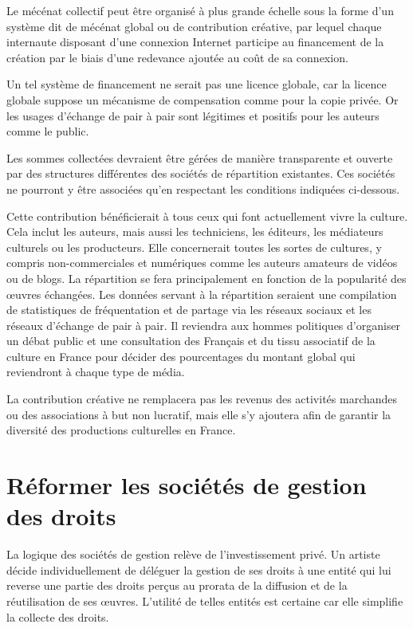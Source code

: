 \begin{mesure}
Le mécénat collectif peut être organisé à plus grande échelle sous la forme d'un système dit de mécénat global ou de contribution créative, par lequel chaque internaute disposant d'une connexion Internet participe au financement de la création par le biais d'une redevance ajoutée au coût de sa connexion. 
\end{mesure}

Un tel système de financement ne serait pas une licence globale, car la licence globale suppose un mécanisme de compensation comme pour la copie privée. Or les usages d'échange de pair à pair sont légitimes et positifs pour les auteurs comme le public.

Les sommes collectées devraient être gérées de manière transparente et ouverte par des structures différentes des sociétés de répartition existantes. Ces sociétés ne pourront y être associées qu'en respectant les conditions indiquées ci-dessous. 

Cette contribution bénéficierait à tous ceux qui font actuellement vivre la culture. Cela inclut les auteurs, mais aussi les techniciens, les éditeurs, les médiateurs culturels ou les producteurs. Elle concernerait toutes les sortes de cultures, y compris non-commerciales et numériques comme les auteurs amateurs de vidéos ou de blogs. La répartition se fera principalement en fonction de la popularité des œuvres échangées. Les données servant à la répartition seraient une compilation de statistiques de fréquentation et de partage via les réseaux sociaux et les réseaux d'échange de pair à pair. Il reviendra aux hommes politiques d'organiser un débat public et une consultation des Français et du tissu associatif de la culture en France pour décider des pourcentages du montant global qui reviendront à chaque type de média. 

La contribution créative ne remplacera pas les revenus des activités marchandes ou des associations à but non lucratif, mais elle s'y ajoutera afin de garantir la diversité des productions culturelles en France.

\section{Réformer les sociétés de gestion des droits}

La logique des sociétés de gestion relève de l'investissement privé. Un artiste décide individuellement de déléguer la gestion de ses droits à une entité qui lui reverse une partie des droits perçus au prorata de la diffusion et de la réutilisation de ses œuvres. L'utilité de telles entités est certaine car elle simplifie la collecte des droits. 


